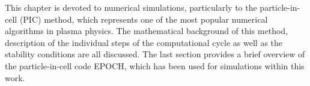 This chapter is devoted to numerical simulations, particularly to the particle-in-cell (PIC) method, which represents one of the most popular numerical algorithms in plasma physics. The mathematical background of this method, description of the individual steps of the computational cycle as well as the stability conditions are all discussed. The last section provides a brief overview of the particle-in-cell code EPOCH, which has been used for simulations within this work.